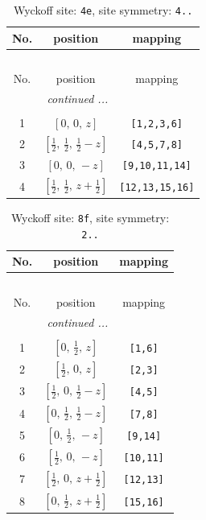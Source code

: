 \documentclass[fleqn,8pt]{jsarticle}
\begin{document}
\renewcommand{\arraystretch}{1.2}
\begin{longtable}{ccc}
\caption{Wyckoff site: {\tt 4e}, site symmetry: {\tt 4..}}
 \\
 \hline \hline
No. & position & mapping \\ \hline \endfirsthead

\multicolumn{2}{l}{\tablename\ \thetable{}} \\
 \hline \hline
No. & position & mapping \\ \hline \endhead

 \hline \hline
\multicolumn{2}{r}{\footnotesize\it continued ...} \\ \endfoot

 \hline \hline
\multicolumn{2}{r}{} \\ \endlastfoot

1 & $\left[ 0,\, 0,\, z \right]$ & {\tt [1,2,3,6]} \\ \hline
2 & $\left[ \frac{1}{2},\, \frac{1}{2},\, \frac{1}{2} - z \right]$ & {\tt [4,5,7,8]} \\ \hline
3 & $\left[ 0,\, 0,\, - z \right]$ & {\tt [9,10,11,14]} \\ \hline
4 & $\left[ \frac{1}{2},\, \frac{1}{2},\, z + \frac{1}{2} \right]$ & {\tt [12,13,15,16]} \\
\end{longtable}
\renewcommand{\arraystretch}{1.2}
\begin{longtable}{ccc}
\caption{Wyckoff site: {\tt 8f}, site symmetry: {\tt 2..}}
 \\
 \hline \hline
No. & position & mapping \\ \hline \endfirsthead

\multicolumn{2}{l}{\tablename\ \thetable{}} \\
 \hline \hline
No. & position & mapping \\ \hline \endhead

 \hline \hline
\multicolumn{2}{r}{\footnotesize\it continued ...} \\ \endfoot

 \hline \hline
\multicolumn{2}{r}{} \\ \endlastfoot

1 & $\left[ 0,\, \frac{1}{2},\, z \right]$ & {\tt [1,6]} \\ \hline
2 & $\left[ \frac{1}{2},\, 0,\, z \right]$ & {\tt [2,3]} \\ \hline
3 & $\left[ \frac{1}{2},\, 0,\, \frac{1}{2} - z \right]$ & {\tt [4,5]} \\ \hline
4 & $\left[ 0,\, \frac{1}{2},\, \frac{1}{2} - z \right]$ & {\tt [7,8]} \\ \hline
5 & $\left[ 0,\, \frac{1}{2},\, - z \right]$ & {\tt [9,14]} \\ \hline
6 & $\left[ \frac{1}{2},\, 0,\, - z \right]$ & {\tt [10,11]} \\ \hline
7 & $\left[ \frac{1}{2},\, 0,\, z + \frac{1}{2} \right]$ & {\tt [12,13]} \\ \hline
8 & $\left[ 0,\, \frac{1}{2},\, z + \frac{1}{2} \right]$ & {\tt [15,16]} \\
\end{longtable}
\end{document}

